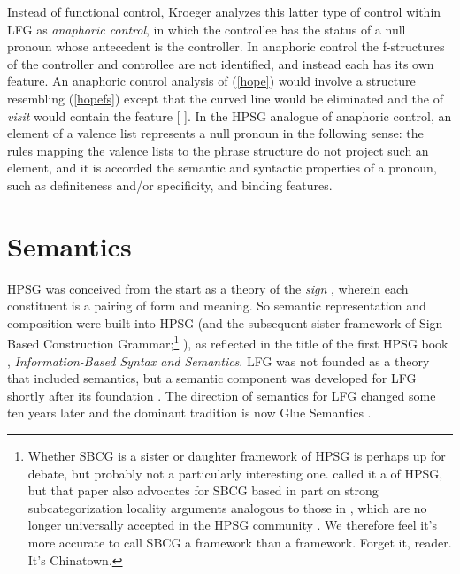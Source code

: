 Instead of functional control, Kroeger analyzes this latter type of control with\-in LFG as \textit{anaphoric control}, in which the controllee has the status of a null pronoun whose antecedent is the controller.  In anaphoric control the f-structures of the controller and controllee are not identified, and instead each has its own  feature.  An anaphoric control analysis of (\ref{hope}) would involve a structure resembling (\ref{hopefs}) except that the curved line would be eliminated and the  of \textit{visit} would contain the feature [ ].  In the HPSG analogue of anaphoric control, an element of a valence list represents a null pronoun in the following sense:  the rules mapping the valence lists to the phrase structure do not project such an element, and it is accorded the semantic and syntactic properties of a pronoun, such as definiteness and/or specificity, and binding features.  

\section{Semantics}


HPSG  was conceived from the
start as  a theory of the \textit{sign} \citep{Saussure16a-Fr}, 
wherein each constituent is a pairing of form and meaning.  
So semantic representation and composition  were built into HPSG (and the subsequent sister framework of Sign-Based Construction Grammar;\footnote{Whether SBCG is a sister or daughter framework of HPSG is perhaps up for debate, but probably not a particularly interesting one. \citet[486]{Sag2010b} called it a  of HPSG, but that paper also advocates for SBCG based in part on strong subcategorization locality arguments analogous to those in \citet[23--24, for example]{ps2}, which are no longer universally accepted in the HPSG community \citep[e.g.,][]{Meurers99b,Prze99,MuellerLehrbuch1,Bender2008a}. We therefore feel it's more accurate to call SBCG a  framework than a  framework. Forget it, reader. It's Chinatown.} \citealt{BS2012a-ed}), as reflected in the title of the first HPSG
book \citep{pollard;sag87}, \textit{Information-Based Syntax and
  Semantics}.  LFG was not founded as a theory that included semantics, but a semantic component was developed for LFG shortly after its foundation \citep{halvorsen83}.  The direction of semantics for LFG changed some ten years later and the dominant tradition is now Glue Semantics \citep{dalrymple;ea93,dalrymple99,Dalrymple2001a-u,asudeh-lpr,dalrymple;ea19}.  

